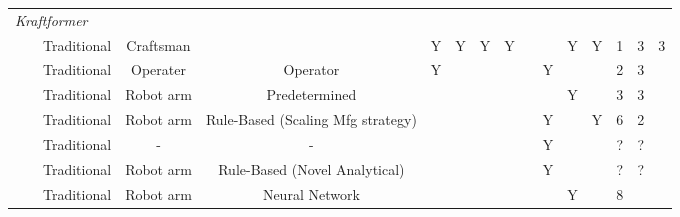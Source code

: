 \begin{tabular}{lccccccccccccccc}
\multicolumn{16}{l}{\textit{Kraftformer}}                                                                                                                                                                                                                                                                                                 \\
 &                                                                                                                 & Traditional & Craftsman       &                                   & Y           & Y          & Y         & Y         &               &            & Y            & Y         & 1   & 3           & 3        \\
 & \citep{Scherer2010DrivingProducts}                                                                              & Traditional & Operater        & Operator                          & Y           &            &           &           &               & Y          &              &           & 2   & 3           &          \\
 & \citep{Hoffman2009AnHandling}                                                                                   & Traditional & Robot arm       & Predetermined                     &             &            &           &           &               &            & Y            &           & 3   & 3           &          \\
 & \citep{Opritescu2012AutomatedStrategy,Opritescu2016VariationVariance,Hartmann2019Knowledge-basedPartitioning}   & Traditional & Robot arm       & Rule-Based (Scaling Mfg strategy) &             &            &           &           &               & Y          &              & Y         & 6   & 2           &          \\
 & \citep{Yang2009AutomatisierungProgramming}                                                                      & Traditional & -               & -                                 &             &            &           &           &               & Y          &              &           & ?   & ?           &          \\
 & \citep{Yang2011GeometricalProcess}                                                                              & Traditional & Robot arm       & Rule-Based (Novel Analytical)     &             &            &           &           &               & Y          &              &           & ?   & ?           &          \\
 & \citep{Opritescu2015AutomatedApproach,Hartmann2019AnFree-forming}                                               & Traditional & Robot arm       & Neural Network                    &             &            &           &           &               &            & Y            &           & 8   &             &          \\

\end{tabular}
